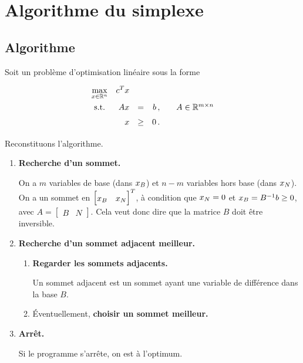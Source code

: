 \section{Algorithme du simplexe}

\subsection{Algorithme}

Soit un problème d'optimisation linéaire sous la forme
\[
\renewcommand{\arraystretch}{1.5}
\begin{array}{c@{\quad}rcr@{\qquad}l}
	\max\limits_{x \in \Rn} & c^T x &     &      &                       \\
	\textnormal{s.t.}       &   A x & =   & b\,, & A \in \R^{m \times n} \\
	                        &     x & \ge & 0\,. &                       \\
\end{array}
\]

Reconstituons l'algorithme.

\begin{enumerate}
	\item \textbf{Recherche d'un sommet.}

	On a $m$ variables de base (dans $x_B$)
	et $n-m$ variables hors base (dans $x_N$).
	On a un sommet en $\begin{bmatrix} \xb & \xn \end{bmatrix}^T$,
	à condition que $x_N = 0$ et $x_B = B^{-1} b \ge 0$,
	avec $A = \begin{bmatrix} B & N \end{bmatrix}$.
	Cela veut donc dire que la matrice $B$ doit être inversible.
	\item \textbf{Recherche d'un sommet adjacent meilleur.}
	\begin{enumerate}
		\item \textbf{Regarder les sommets adjacents.}

		Un sommet adjacent est un sommet ayant
		une variable de différence dans la base $B$.
		\item Éventuellement, \textbf{choisir un sommet meilleur.}
	\end{enumerate}
	\item \textbf{Arrêt.}

	Si le programme s'arrête, on est à l'optimum.
\end{enumerate}


